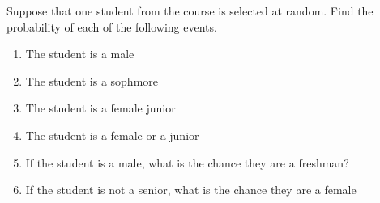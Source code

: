 \documentclass{report}
\begin{document}
\bigbreak \noindent
Suppose that one student from the course is selected at random. Find the probability of each of the following events.
\begin{enumerate}
  \item The student is a male 
  \item The student is a sophmore
  \item The student is a female junior
  \item The student is a female or a junior
  \item If the student is a male, what is the chance they are a freshman?
  \item If the student is not a senior, what is the chance they are a female
\end{enumerate}
\end{document}
